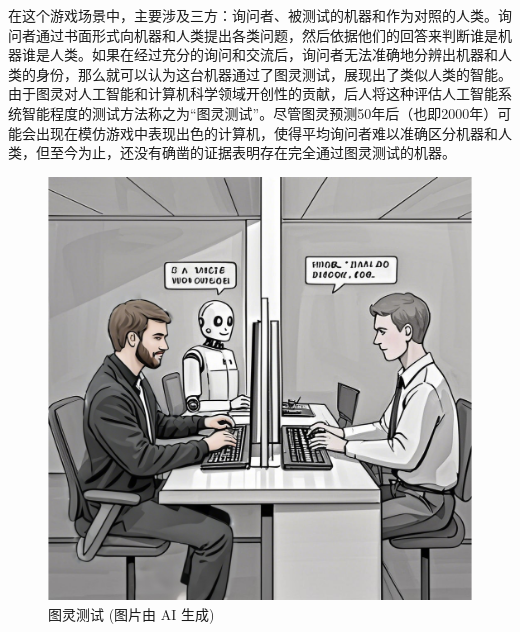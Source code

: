 在这个游戏场景中，主要涉及三方：询问者、被测试的机器和作为对照的人类。询问者通过书面形式向机器和人类提出各类问题，然后依据他们的回答来判断谁是机器谁是人类。如果在经过充分的询问和交流后，询问者无法准确地分辨出机器和人类的身份，那么就可以认为这台机器通过了图灵测试，展现出了类似人类的智能。由于图灵对人工智能和计算机科学领域开创性的贡献，后人将这种评估人工智能系统智能程度的测试方法称之为“图灵测试”。尽管图灵预测50年后（也即2000年）可能会出现在模仿游戏中表现出色的计算机，使得平均询问者难以准确区分机器和人类，但至今为止，还没有确凿的证据表明存在完全通过图灵测试的机器。
\begin{figure}[htb]
	\centering
	\includegraphics[width=0.75\linewidth]{image/1/图灵测试1.png}
	\caption{图灵测试 (图片由 AI 生成)}
\end{figure}

